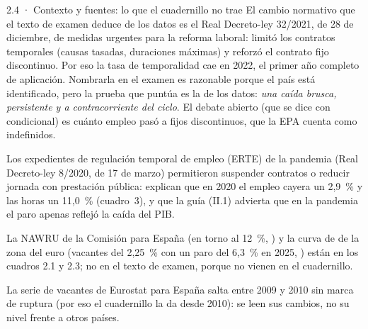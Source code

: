 \begin{complemento}{2.4 · Contexto y fuentes: lo que el cuadernillo no trae}
 El cambio normativo que el texto de examen deduce de los datos es el Real Decreto-ley 32/2021, de 28 de diciembre, de medidas urgentes para la reforma laboral: limitó los contratos temporales (causas tasadas, duraciones máximas) y reforzó el contrato fijo discontinuo. Por eso la tasa de temporalidad cae en 2022, el primer año completo de aplicación. Nombrarla en el examen es razonable porque el país está identificado, pero la prueba que puntúa es la de los datos: \emph{una caída brusca, persistente y a contracorriente del ciclo}. El debate abierto (que se dice con condicional) es cuánto empleo pasó a fijos discontinuos, que la EPA cuenta como indefinidos.

 Los expedientes de regulación temporal de empleo (ERTE) de la pandemia (Real Decreto-ley 8/2020, de 17 de marzo) permitieron suspender contratos o reducir jornada con prestación pública: explican que en 2020 el empleo cayera un 2,9~\% y las horas un 11,0~\% (cuadro~3), y que la guía (II.1) advierta que en la pandemia el paro apenas reflejó la caída del PIB.

 La NAWRU de la Comisión para España (en torno al 12~\%, \cite{CE2026AMECO}) y la curva de  de la zona del euro (vacantes del 2,25~\% con un paro del 6,3~\% en 2025, \cite{Eurostat2026jvs}) están en los cuadros 2.1 y 2.3; no en el texto de examen, porque no vienen en el cuadernillo.

 La serie de vacantes de Eurostat para España salta entre 2009 y 2010 sin marca de ruptura (por eso el cuadernillo la da desde 2010): se leen sus cambios, no su nivel frente a otros países.
\end{complemento}

